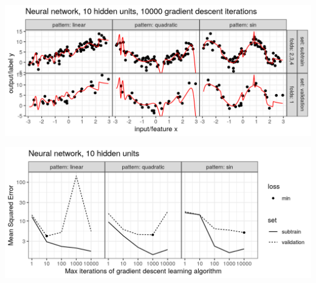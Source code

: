 \begin{frame}
  \includegraphics[width=\textwidth]{figure-overfitting-pred-units=10-maxit=10000.png}
\end{frame}


\begin{frame}
  \includegraphics[width=\textwidth]{figure-overfitting-data-loss-10.png}
\end{frame}

